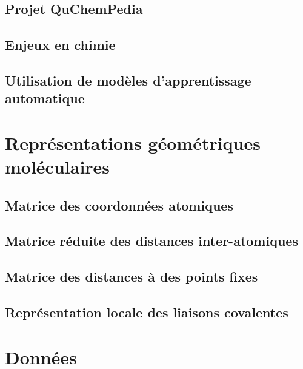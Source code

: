 \documentclass{report}
\begin{document}
	\section{Projet QuChemPedia}
		
	\section{Enjeux en chimie}
		
	\section{Utilisation de modèles d'apprentissage automatique}
		
		
\chapter{Représentations géométriques moléculaires}
	
	\section{Matrice des coordonnées atomiques}
		

	\section{Matrice réduite des distances inter-atomiques}
		
		
	\section{Matrice des distances à des points fixes}
		
		
	\section{Représentation locale des liaisons covalentes}
		

\newpage\null\thispagestyle{empty}\newpage
\newpage\null\thispagestyle{empty}\newpage

\chapter{Données}
	
\end{document}
